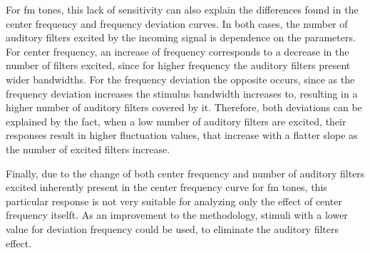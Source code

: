\documentclass[../main.tex]{subfiles}
\begin{document}
For \gls{fm} tones, this lack of sensitivity can also explain the differences
found in the center frequency and frequency deviation curves. In both cases,
the number of auditory filters excited by the incoming signal is dependence on
the parameters. For center frequency, an increase of frequency corresponds to a
decrease in the number of filters excited, since for higher frequency the
auditory filters present wider bandwidths. For the frequency deviation the
opposite occurs, since as the frequency deviation increases the stimulus
bandwidth increases to, resulting in a higher number of auditory filters covered
by it. Therefore, both deviations can be explained by the fact, when a low
number of auditory filters are excited, their responses result in higher
fluctuation values, that increase with a flatter slope as the number of excited
filters increase.

Finally, due to the change of both center frequency and number of auditory
filters excited inherently present in the center frequency curve for \gls{fm}
tones, this particular response is not very suitable for analyzing only the
effect of center frequency itselft. As an improvement to the methodology,
stimuli with a lower value for deviation frequency could be used, to eliminate
the auditory filters effect.
\end{document}
